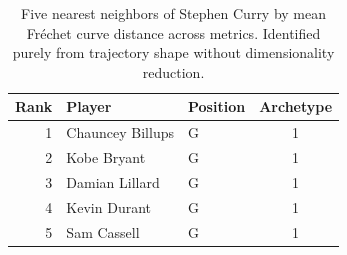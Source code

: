 \begin{table}[htbp]
  \centering\small
  \begin{tabular}{rllc}
    \toprule
    Rank & Player & Position & Archetype \\
    \midrule
    1 & Chauncey Billups & G & 1 \\
    2 & Kobe Bryant & G & 1 \\
    3 & Damian Lillard & G & 1 \\
    4 & Kevin Durant & G & 1 \\
    5 & Sam Cassell & G & 1 \\
    \bottomrule
  \end{tabular}
  \caption{Five nearest neighbors of Stephen Curry by mean Fr\'{e}chet curve distance across metrics. Identified purely from trajectory shape without dimensionality reduction.}
  \label{tab:Stephen_Curry_frechet_curve_neighbors}
\end{table}

